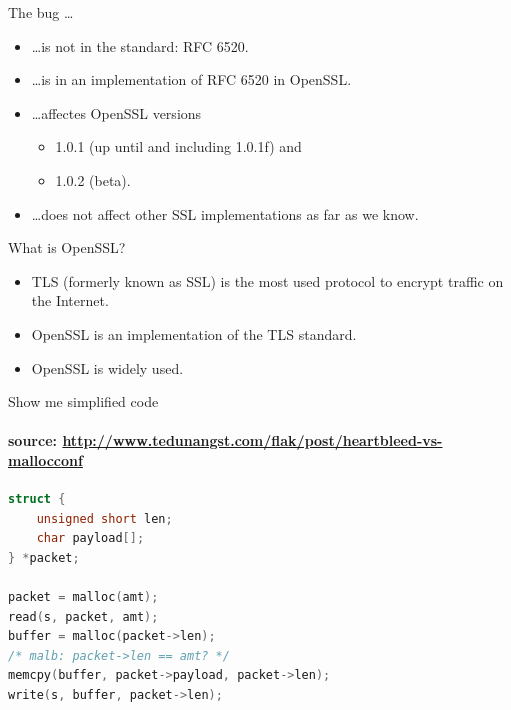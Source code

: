 \documentclass[10pt]{beamer}
\begin{document}
\begin{frame}{The bug \dots}

\begin{itemize}
 \item \dots is not in the standard: RFC 6520.
 \item \dots is in an implementation of RFC 6520 in OpenSSL.
 \item \dots affectes OpenSSL versions 
  \begin{itemize}
    \item 1.0.1 (up until and including 1.0.1f) and 
    \item 1.0.2 (beta).
  \end{itemize}
  
 \item \dots does not affect other SSL implementations as far as we know.
\end{itemize}
\end{frame}

\begin{frame}{What is OpenSSL?}

\begin{itemize}
  \item TLS (formerly known as SSL) is the most used protocol to encrypt traffic on the Internet.
  \item OpenSSL is an implementation of the TLS standard.
  \item OpenSSL is widely used.
\end{itemize}
\end{frame}

\begin{frame}[fragile]{Show me simplified code}
\framesubtitle{{\scriptsize \textbf{source:} \url{http://www.tedunangst.com/flak/post/heartbleed-vs-mallocconf}}}

\begin{lstlisting}[language=c,morekeywords={malloc,read,memcpy,write}]
struct { 
    unsigned short len;
    char payload[]; 
} *packet; 

packet = malloc(amt);
read(s, packet, amt);
buffer = malloc(packet->len);
/* malb: packet->len == amt? */
memcpy(buffer, packet->payload, packet->len);
write(s, buffer, packet->len);
\end{lstlisting}

\end{frame}
\end{document}
